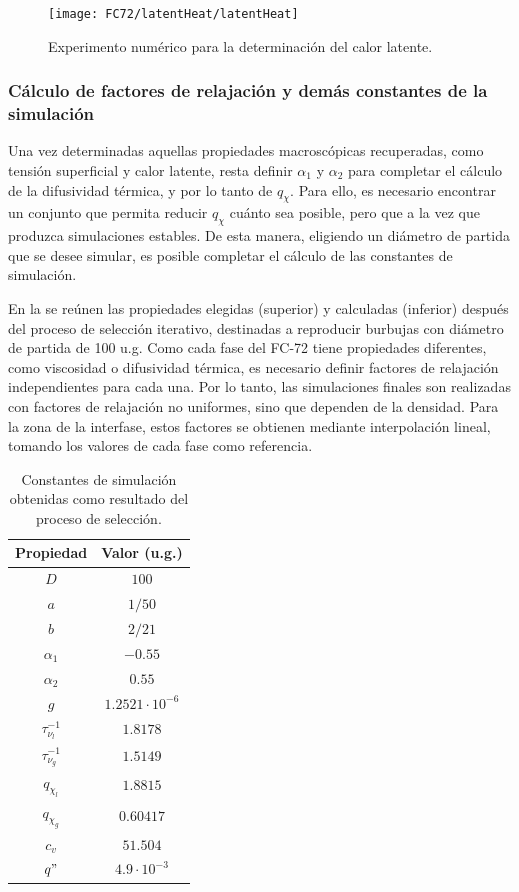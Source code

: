 \begin{figure}[ht]
	\centering
	\texttt{[image: FC72/latentHeat/latentHeat]}
	\caption{Experimento num\'erico para la determinaci\'on del calor latente.}
	\label{fig:calor_latente_3D}
\end{figure}


\subsubsection{C\'alculo de factores de relajaci\'on y dem\'as constantes de la simulaci\'on}

Una vez determinadas aquellas propiedades macrosc\'opicas recuperadas, como tensi\'on superficial y calor latente, resta definir $\alpha_1$ y $\alpha_2$ para completar el c\'alculo de la difusividad t\'ermica, y por lo tanto de $q_{\chi}$. Para ello, es necesario encontrar un conjunto que permita reducir $q_{\chi}$ cu\'anto sea posible, pero que a la vez que produzca simulaciones estables. De esta manera, eligiendo un di\'ametro de partida que se desee simular, es posible completar el c\'alculo de las constantes de simulaci\'on. 

En la  se re\'unen las propiedades elegidas (superior) y calculadas (inferior) despu\'es del proceso de selecci\'on iterativo, destinadas a reproducir burbujas con di\'ametro de partida de 100 u.g. Como cada fase del FC-72 tiene propiedades diferentes, como viscosidad o difusividad t\'ermica, es necesario definir factores de relajaci\'on independientes para cada una. Por lo tanto, las simulaciones finales son realizadas con factores de relajaci\'on no uniformes, sino que dependen de la densidad. Para la zona de la interfase, estos factores se obtienen mediante interpolaci\'on lineal, tomando los valores de cada fase como referencia.

\begin{table}[ht]
	\centering
    \begin{tabular}{c c}
	    \toprule
        \bf Propiedad & \bf Valor (u.g.)\\
        \midrule
        $D$ & $100$ \\
        $a$ & $1/50$ \\
        $b$ & $2/21$ \\
        $\alpha_1$ & $-0.55$ \\
        $\alpha_2$ & $0.55$ \\
        \midrule
		$g$ & $1.2521 \cdot 10^{-6}$\\
		$\tau_{\nu_l}^{-1}$ & $1.8178$\\
		$\tau_{\nu_g}^{-1}$ & $1.5149$ \\
		$q_{\chi_l}$ & $1.8815$ \\
		$q_{\chi_g}$ & $0.60417$ \\
		$c_v$ & $51.504$ \\
		$q"$ & $4.9 \cdot 10^{-3}$ \\
        \bottomrule
	\end{tabular}
	\caption{Constantes de simulaci\'on obtenidas como resultado del proceso de selecci\'on.}
	\label{tab:param_hutter_3D}
\end{table} 
\FloatBarrier



